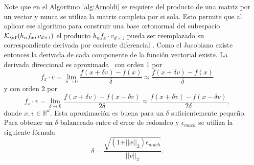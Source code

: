  Note que en el Algoritmo \ref{alg:Arnoldi} se requiere del producto de una matriz por un vector y nunca se utiliza la matriz completa por si sola.
Esto permite que al aplicar ese algoritmo para construir una base ortonormal del subespacio $\mathcal{K}_\mf(h_nf_x,v_{d\times 1})$ el producto $h_nf_x\cdot v_{d\times 1}$ pueda ser reemplazado su correspondiente derivada por cociente diferencial \cite{carr11,newtonkry}. Como el Jacobiano existe entonces la derivada de cada componente de la funci\'on vectorial existe. 
La derivada direccional es aproximada~\cite{numerical} con orden 1 por
\[f_x\cdot v = \lim\limits_{\delta\to 0}\frac{f(x + \delta v)-f(x)}{\delta} \approx \frac{f(x + \delta v)-f(x)}{\delta}\]
y con orden 2 por
\[  f_x\cdot v = \lim\limits_{\delta\to 0}\frac{f(x + \delta v)-f(x-\delta v)}{2\delta} \approx \frac{f(x + \delta v)-f(x-\delta v)}{2\delta},\]
donde $x,v\in\mathbb{R}^{d}$. Esta aproximaci\'on es buena para un $\delta$ suficientemente pequeño. Para obtener un $\delta$ balanceado 
entre el error de redondeo y $\epsilon_{mach}$ se utiliza la siguiente f\'ormula~\cite{freej}
\begin{equation}
	\delta = \frac{\sqrt{(1+ \vert\vert x \vert\vert_2)\epsilon_{mach}}}{\vert\vert v \vert\vert_2}. \label{deltavar}
\end{equation}

